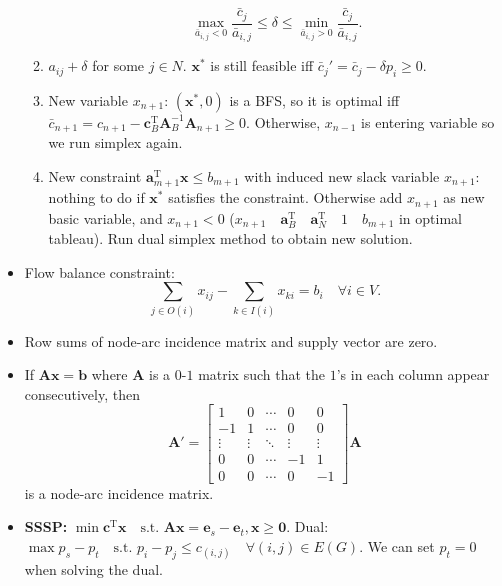 \documentclass[10pt]{article}
\begin{document}
\begin{multicols*}{3}
\begin{itemize}
\begin{enumerate}
\begin{equation*}
                    \max_{\bar{a}_{i, j} < 0} \frac{\bar{c}_j}{\bar{a}_{i, j}} \leq \delta \leq \min_{\bar{a}_{i, j} > 0} \frac{\bar{c}_j}{\bar{a}_{i, j}}.
                \end{equation*}
                \item $a_{ij} + \delta$ for some $j \in N$. $\bm{x}^*$ is still feasible iff $\bar{c}_j' = \bar{c}_j - \delta p_i \geq 0$.
                \item New variable $x_{n + 1}$: $(\bm{x}^*, 0)$ is a BFS, so it is optimal iff $\bar{c}_{n + 1} = c_{n + 1} - \bm{c}_B^{\mathrm{T}}\bm{A}_B^{-1}\bm{A}_{n + 1} \geq 0$. Otherwise, $x_{n - 1}$ is entering variable so we run simplex again.
                \item New constraint $\bm{a}_{m + 1}^{\mathrm{T}}\bm{x} \leq b_{m + 1}$ with induced new slack variable $x_{n + 1}$: nothing to do if $\bm{x}^*$ satisfies the constraint. Otherwise add $x_{n + 1}$ as new basic variable, and $x_{n + 1} < 0$ ($x_{n + 1} \quad \bm{a}_B^{\mathrm{T}} \quad \bm{a}_N^{\mathrm{T}} \quad 1 \quad b_{m + 1}$ in optimal tableau). Run dual simplex method to obtain new solution.
            \end{enumerate}
            \item Flow balance constraint: 
            \begin{equation*}
                \sum_{j \in O(i)}x_{ij} - \sum_{k \in I(i)}x_{ki} = b_i \quad \forall i \in V.
            \end{equation*}
            \item Row sums of node-arc incidence matrix and supply vector are zero.
            \item If $\bm{Ax = b}$ where $\bm{A}$ is a $0$-$1$ matrix such that the $1$'s in each column appear consecutively, then 
            \begin{equation*}
                \bm{A}' = \begin{bmatrix}
                    1 & 0 & \cdots & 0 & 0 \\
                    -1 & 1 & \cdots & 0 & 0 \\
                    \vdots & \vdots & \ddots & \vdots & \vdots \\
                    0 & 0 & \cdots & - 1 & 1 \\
                    0 & 0 & \cdots & 0 & -1
                \end{bmatrix}\bm{A}
            \end{equation*}
            is a node-arc incidence matrix.
            \item \textbf{SSSP:} $\min \bm{c}^{\mathrm{T}}\bm{x} \quad \textrm{s.t. } \bm{Ax} = \bm{e}_s - \bm{e}_t, \bm{x} \geq \mathbf{0}$. Dual: $\max p_s - p_t \quad \textrm{s.t. }p_i - p_j \leq c_{(i, j)} \quad \forall (i, j) \in E(G)$. We can set $p_t = 0$ when solving the dual.

\end{itemize}
\end{multicols*}
\end{document}
